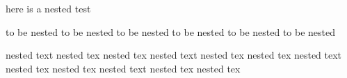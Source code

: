 here is a nested test
\begin{one}
	to be nested to be nested
	to be nested to be nested
	to be nested to be nested
	\begin{two}
		nested text nested tex nested tex
		nested text nested tex nested tex
		nested text nested tex nested tex
		nested text nested tex nested tex
	\end{two}
\end{one}
